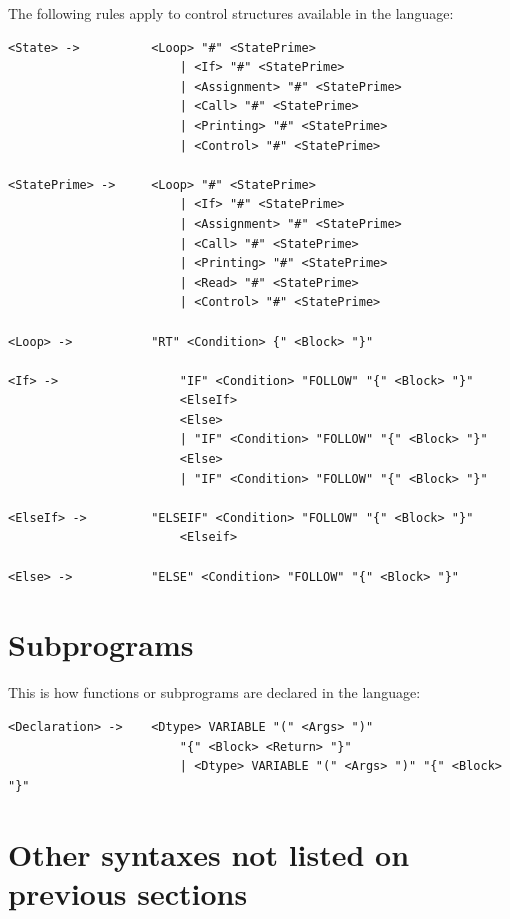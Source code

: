 \documentclass[11pt,a4paper]{report}
\begin{document}
The following rules apply to control structures available in the language:
\begin{lstlisting}
<State> ->			<Loop> "#" <StatePrime>
        				| <If> "#" <StatePrime>
        				| <Assignment> "#" <StatePrime>
        				| <Call> "#" <StatePrime>
        				| <Printing> "#" <StatePrime>
        				| <Control> "#" <StatePrime>
        			
<StatePrime> -> 	<Loop> "#" <StatePrime>
        				| <If> "#" <StatePrime>
        				| <Assignment> "#" <StatePrime>
        				| <Call> "#" <StatePrime>
        				| <Printing> "#" <StatePrime>
        				| <Read> "#" <StatePrime>
        				| <Control> "#" <StatePrime>
        			
<Loop> -> 			"RT" <Condition> {" <Block> "}"

<If> -> 				"IF" <Condition> "FOLLOW" "{" <Block> "}"
						<ElseIf>
						<Else>
        				| "IF" <Condition> "FOLLOW" "{" <Block> "}"
        				<Else>
        				| "IF" <Condition> "FOLLOW" "{" <Block> "}"
        			
<ElseIf> ->			"ELSEIF" <Condition> "FOLLOW" "{" <Block> "}"
						<Elseif>

<Else> -> 			"ELSE" <Condition> "FOLLOW" "{" <Block> "}"
\end{lstlisting}

\section{Subprograms}

This is how functions or subprograms are declared in the language:
\begin{lstlisting}
<Declaration> ->	<Dtype> VARIABLE "(" <Args> ")"
						"{" <Block> <Return> "}"
						| <Dtype> VARIABLE "(" <Args> ")" "{" <Block> "}"
\end{lstlisting}

\section{Other syntaxes not listed on previous sections}
\end{document}
